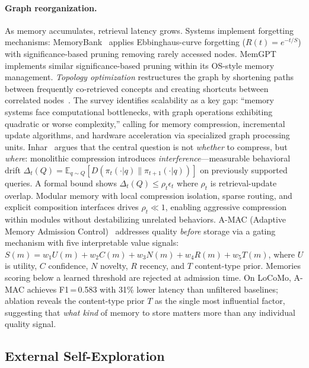 \documentclass[hf]{ceurart}
\begin{document}
\paragraph{Graph reorganization.}
As memory accumulates, retrieval latency grows. Systems implement
forgetting mechanisms: MemoryBank~\cite{memorybank2024} applies
Ebbinghaus-curve forgetting ($R(t) = e^{-t/S}$) with
significance-based pruning removing rarely accessed nodes.
MemGPT~\cite{packer2023} implements similar significance-based pruning
within its OS-style memory management.
\emph{Topology optimization} restructures the graph by shortening paths
between frequently co-retrieved concepts and creating shortcuts between
correlated nodes~\cite{graphmemsurvey2026}. The survey identifies
scalability as a key gap: ``memory systems face computational
bottlenecks, with graph operations exhibiting quadratic or worse
complexity,'' calling for memory compression, incremental update
algorithms, and hardware acceleration via specialized graph processing
units. Inhar~\cite{localizecompress2026} argues that the central
question is not \emph{whether} to compress, but \emph{where}:
monolithic compression introduces \emph{interference}---measurable
behavioral drift $\Delta_t(Q) = \mathbb{E}_{q \sim Q}[D(\pi_t(\cdot|q)
\| \pi_{t+1}(\cdot|q))]$ on previously supported queries. A formal
bound shows $\Delta_t(Q) \leq \rho_t \epsilon_t$ where $\rho_t$ is
retrieval-update overlap. Modular memory with local compression
isolation, sparse routing, and explicit composition interfaces drives
$\rho_t \ll 1$, enabling aggressive compression within modules without
destabilizing unrelated behaviors.
A-MAC (Adaptive Memory Admission Control)~\cite{amac2026} addresses
quality \emph{before} storage via a gating mechanism with five
interpretable value signals: $S(m) = w_1 U(m) + w_2 C(m) + w_3 N(m)
+ w_4 R(m) + w_5 T(m)$, where $U$ is utility, $C$ confidence, $N$
novelty, $R$ recency, and $T$ content-type prior. Memories scoring
below a learned threshold are rejected at admission time. On LoCoMo,
A-MAC achieves F1\,=\,0.583 with 31\% lower latency than unfiltered
baselines; ablation reveals the content-type prior $T$ as the single
most influential factor, suggesting that \emph{what kind} of memory
to store matters more than any individual quality signal.

\subsection{External Self-Exploration}
\end{document}
